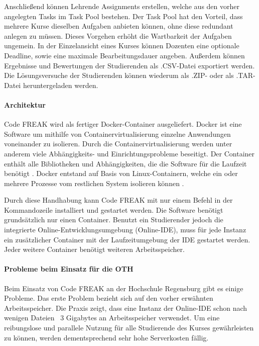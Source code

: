 Anschließend können Lehrende Assignments erstellen, welche aus den vorher
angelegten Tasks im Task Pool bestehen. Der Task Pool hat den Vorteil, dass
mehrere Kurse dieselben Aufgaben anbieten können, ohne diese redundant anlegen
zu müssen. Dieses Vorgehen erhöht die Wartbarkeit der Aufgaben ungemein. In der
Einzelansicht eines Kurses können Dozenten eine optionale Deadline, sowie eine
maximale Bearbeitungsdauer angeben. Außerdem können Ergebnisse und Bewertungen
der Studierenden als .CSV-Datei exportiert werden. Die Lösungsversuche der
Studierenden können wiederum als .ZIP- oder als .TAR-Datei heruntergeladen
werden.

\paragraph{Architektur}
Code FREAK wird als fertiger Docker-Container ausgeliefert. Docker ist eine
Software um mithilfe von Containervirtualisierung einzelne Anwendungen
voneinander zu isolieren. Durch die Containervirtualisierung werden unter
anderem viele Abhängigkeits- und Einrichtungsprobleme beseitigt. Der Container
enthält alle Bibliotheken und Abhängigkeiten, die die Software für die Laufzeit
benötigt \parencite{docker}. Docker entstand auf Basis von Linux-Containern, welche
ein oder mehrere Prozesse vom restlichen System isolieren können 
\parencite{linux-container}.

Durch diese Handhabung kann Code FREAK mit nur einem Befehl in der
Kommandozeile installiert und gestartet werden. Die Software benötigt
grundsätzlich nur einen Container. Benutzt ein Studierender jedoch die
integrierte Online-Entwicklungsumgebung (Online-IDE), muss für jede Instanz ein
zusätzlicher Container mit der Laufzeitumgebung der IDE gestartet werden. Jeder
weitere Container benötigt weiteren Arbeitsspeicher.

\paragraph{Probleme beim Einsatz für die OTH}
Beim Einsatz von Code FREAK an der Hochschule Regensburg gibt es einige
Probleme. Das erste Problem bezieht sich auf den vorher erwähnten
Arbeitsspeicher. Die Praxis zeigt, dass eine Instanz der Online-IDE schon nach
wenigen Dateien ~3 Gigabytes an Arbeitsspeicher verwendet. Um eine reibungslose
und parallele Nutzung für alle Studierende des Kurses gewährleisten zu können,
werden dementsprechend sehr hohe Serverkosten fällig. 
\parencite{codefreak-memory-problem}

